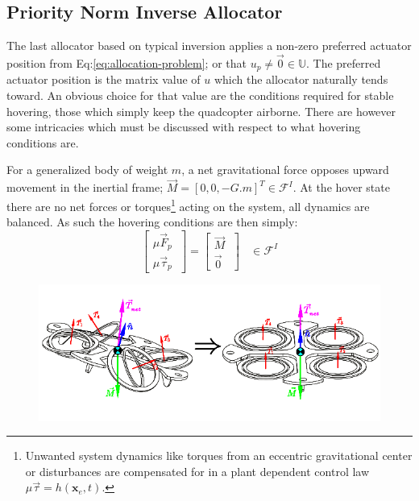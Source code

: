 {\subsection{Priority Norm Inverse Allocator}
\label{subsec:control.allocation.norminverse}
The last allocator based on typical inversion applies a non-zero preferred actuator position from Eq:\ref{eq:allocation-problem}; or that $u_p\not=\vec{0}\in\mathbb{U}$. The preferred actuator position is the matrix value of $u$ which the allocator naturally tends toward. An obvious choice for that value are the conditions required for stable hovering, those which simply keep the quadcopter airborne. There are however some intricacies which must be discussed with respect to what hovering conditions are.
\par
For a generalized body of weight $m$, a net gravitational force opposes upward movement in the inertial frame; $\vec{M}=[0, 0, -G.m]^T\in\mathcal{F}^I$. At the hover state there are no net forces or torques\footnote{Unwanted system dynamics like torques from an eccentric gravitational center or disturbances are compensated for in a plant dependent control law $\mu\vec{\tau}=h(\mathbf{x}_e,t)$.} acting on the system, all dynamics are balanced. As such the hovering conditions are then simply:
\begin{equation}\label{eq:hover}
\begin{bmatrix}
\mu\vec{F}_p\hspace{3pt}\\
\mu\vec{\tau}_p\hspace{3pt}
\end{bmatrix}
=
\begin{bmatrix}
\vec{M}\hspace{3pt}\\
\vec{0}\hspace{3pt}
\end{bmatrix}~~~~\in\mathcal{F}^I
\end{equation}
\par
\begin{figure}[htbp]
\centering
\includegraphics[width=\textwidth]{figs/hover-inertial}

\end{figure}}
